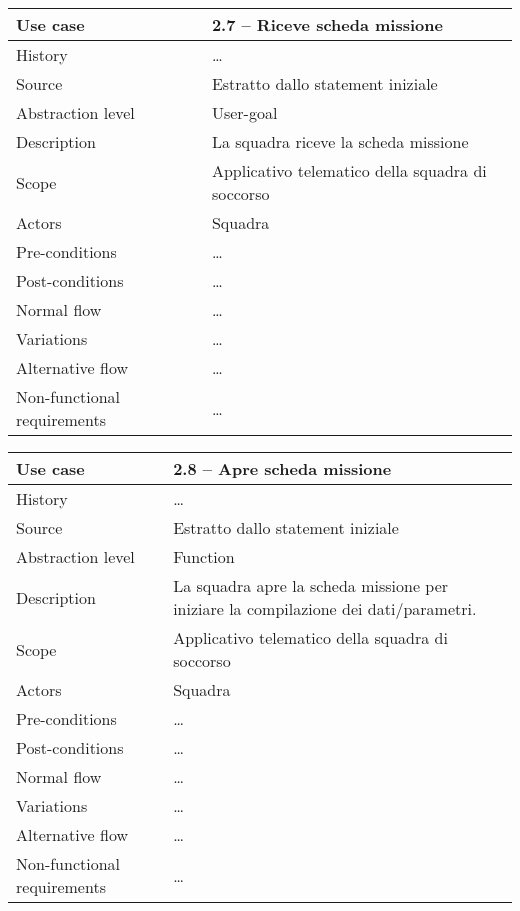\documentclass{article}
\begin{document}
    \begin{table}
        \begin{tabularx}{\textwidth}{l|X}
            Use case & 2.7 – Riceve scheda missione\\
            \hline
            History & \dots \\
            Source & Estratto dallo statement iniziale\\
            Abstraction level & User-goal\\
            Description & La squadra riceve la scheda missione\\
            Scope & Applicativo telematico della squadra di soccorso\\
            Actors & Squadra\\
            Pre-conditions & \dots \\
            Post-conditions & \dots \\
            Normal flow & \dots \\
            Variations & \dots \\
            Alternative flow & \dots \\
            Non-functional requirements & \dots
        \end{tabularx}
        \label{tab:usecase2.7}
    \end{table}

    \begin{table}
        \begin{tabularx}{\textwidth}{l|X}
            Use case & 2.8 – Apre scheda missione\\
            \hline
            History & \dots \\
            Source & Estratto dallo statement iniziale\\
            Abstraction level & Function\\
            Description & La squadra apre la scheda missione per iniziare la compilazione dei dati/parametri.\\
            Scope & Applicativo telematico della squadra di soccorso\\
            Actors & Squadra\\
            Pre-conditions & \dots \\
            Post-conditions & \dots \\
            Normal flow & \dots \\
            Variations & \dots \\
            Alternative flow & \dots \\
            Non-functional requirements & \dots
        \end{tabularx}
        \label{tab:usecase2.8}
    \end{table}
\end{document}
